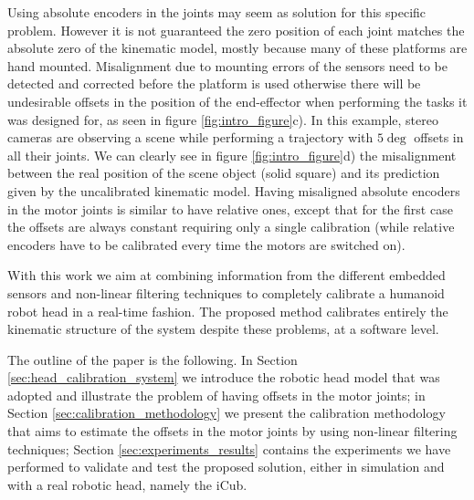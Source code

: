 Using absolute encoders in the joints may seem as solution for this specific problem. However it is not guaranteed the zero position of each joint matches the absolute zero of the kinematic model, mostly because many of these platforms are hand mounted. Misalignment due to mounting errors of the sensors need to be detected and corrected before the platform is used otherwise there will be undesirable offsets in the position of the end-effector when performing the tasks it was designed for, as seen in figure \ref{fig:intro_figure}c). In this example, stereo cameras are observing a scene while performing a trajectory with $5\deg$ offsets in all their joints. We can clearly see in figure \ref{fig:intro_figure}d) the misalignment between the real position of the scene object (solid square) and its prediction given by the uncalibrated kinematic model. Having misaligned absolute encoders in the motor joints is similar to have relative ones, except that for the first case the offsets are always constant requiring only a single calibration (while relative encoders have to be calibrated every time the motors are switched on).


With this work we aim at combining information from the different embedded sensors and non-linear filtering techniques to completely calibrate a humanoid robot head in a real-time fashion. The proposed method calibrates entirely the kinematic structure of the system despite these problems, at a software level.

The outline of the paper is the following. In Section \ref{sec:head_calibration_system} we introduce the robotic head model that was adopted and illustrate the problem of having offsets in the motor joints; in Section \ref{sec:calibration_methodology} we present the calibration methodology that aims to estimate the offsets in the motor joints by using non-linear filtering techniques; Section \ref{sec:experiments_results} contains the experiments we have performed to validate and test the proposed solution, either in simulation and with a real robotic head, namely the iCub.

